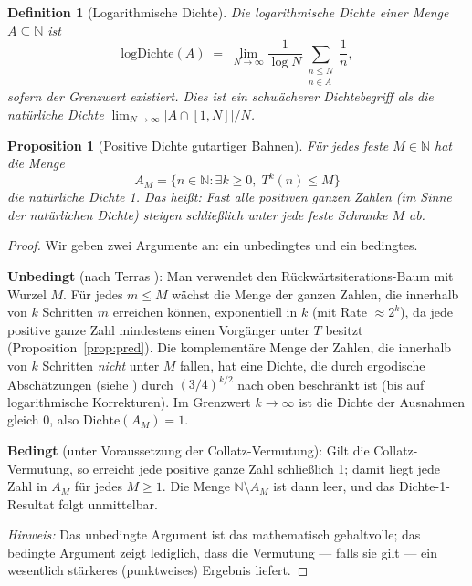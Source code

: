 \documentclass[12pt,a4paper]{article}
\newtheorem{proposition}[theorem]{Proposition}
\newtheorem{definition}[theorem]{Definition}
\begin{document}
\begin{definition}[Logarithmische Dichte]\label{def:logdens}
Die \emph{logarithmische Dichte} einer Menge $A \subseteq \mathbb{N}$ ist
\[
  \mathrm{logDichte}(A) \;=\; \lim_{N \to \infty} \frac{1}{\log N} \sum_{\substack{n \leq N \\ n \in A}} \frac{1}{n},
\]
sofern der Grenzwert existiert. Dies ist ein schwächerer Dichtebegriff als die
natürliche Dichte $\lim_{N\to\infty} |A \cap [1,N]|/N$.
\end{definition}

\begin{proposition}[Positive Dichte gutartiger Bahnen]\label{prop:pos_density}
Für jedes feste $M \in \mathbb{N}$ hat die Menge
\[
  A_M = \{n \in \mathbb{N} : \exists k \geq 0,\; T^k(n) \leq M\}
\]
die natürliche Dichte 1. Das heißt: Fast alle positiven ganzen Zahlen (im Sinne der
natürlichen Dichte) steigen schließlich unter jede feste Schranke $M$ ab.
\end{proposition}

\begin{proof}
Wir geben zwei Argumente an: ein unbedingtes und ein bedingtes.

\textbf{Unbedingt} (nach Terras \cite{Terras1976}):
Man verwendet den Rückwärtsiterations-Baum mit Wurzel $M$. Für jedes $m \leq M$ wächst
die Menge der ganzen Zahlen, die innerhalb von $k$ Schritten $m$ erreichen können,
exponentiell in $k$ (mit Rate $\approx 2^k$), da jede positive ganze Zahl mindestens
einen Vorgänger unter $T$ besitzt (Proposition~\ref{prop:pred}).
Die komplementäre Menge der Zahlen, die innerhalb von $k$ Schritten \emph{nicht}
unter $M$ fallen, hat eine Dichte, die durch ergodische Abschätzungen
(siehe \cite{Terras1976}) durch $(3/4)^{k/2}$ nach oben beschränkt ist
(bis auf logarithmische Korrekturen). Im Grenzwert $k \to \infty$ ist die Dichte
der Ausnahmen gleich 0, also $\mathrm{Dichte}(A_M) = 1$.

\textbf{Bedingt} (unter Voraussetzung der Collatz-Vermutung):
Gilt die Collatz-Vermutung, so erreicht jede positive ganze Zahl schließlich 1;
damit liegt jede Zahl in $A_M$ für jedes $M \geq 1$. Die Menge
$\mathbb{N} \setminus A_M$ ist dann leer, und das Dichte-1-Resultat folgt unmittelbar.

\emph{Hinweis:} Das unbedingte Argument ist das mathematisch gehaltvolle; das bedingte
Argument zeigt lediglich, dass die Vermutung --- falls sie gilt --- ein wesentlich
stärkeres (punktweises) Ergebnis liefert.
\end{proof}
\end{document}
